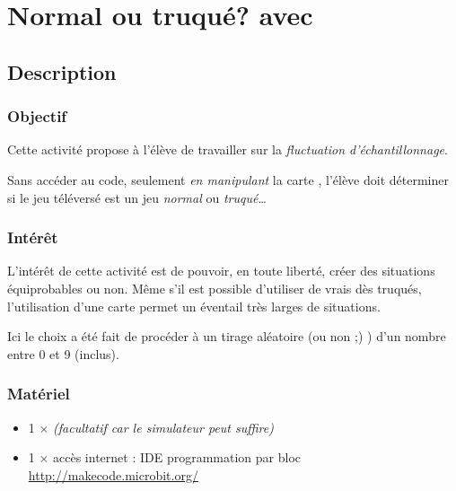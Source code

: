 

\section{Normal ou truqué? avec \mb}

%

\subsection{Description}

\subsubsection{Objectif}


\begin{formule}
Cette activité propose à l'élève de travailler sur la \emph{fluctuation d'échantillonnage}.

Sans accéder au code, seulement \emph{en manipulant} la carte \mb, l'élève doit déterminer si le jeu téléversé est un jeu \emph{normal} ou \emph{truqué}\ldots
\end{formule}


\subsubsection{Intérêt}

L'intérêt de cette activité est de pouvoir, en toute liberté, créer des situations équiprobables ou non. Même s'il est possible d'utiliser de vrais dès truqués, l'utilisation d'une carte \mb permet un éventail très larges de situations.

Ici le choix a été fait de procéder à un tirage aléatoire (ou non ;) ) d'un nombre entre 0 et 9 (inclus).


\subsubsection{Matériel}
\begin{itemize}
    \item 1 $\times$ \matosMb \emph{(facultatif car le simulateur peut suffire)}
    \item 1 $\times$ accès internet : IDE programmation par bloc \url{http://makecode.microbit.org/}
\end{itemize}



